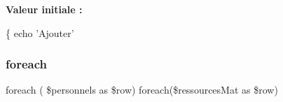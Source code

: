 {\bfseries Valeur initiale \+:}
\begin{DoxyCode}
\{
    echo \textcolor{stringliteral}{'Ajouter'}
\end{DoxyCode}
\mbox{\label{_div__add_activite_8php_a5c760e40b04dbad14587e12b1cd1f157}} 
\subsubsection{\texorpdfstring{foreach}{foreach}}
{\footnotesize\ttfamily foreach ( \$personnels as \$row) foreach(\$ressources\+Mat as \$row)}


